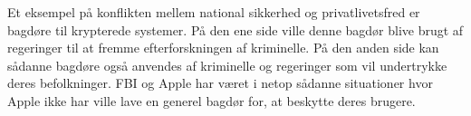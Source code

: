 Et eksempel på konflikten mellem national sikkerhed og privatlivetsfred er bagdøre til krypterede systemer. På den ene side ville denne bagdør blive brugt af regeringer til at fremme efterforskningen af kriminelle. På den anden side kan sådanne bagdøre også anvendes af kriminelle og regeringer som vil undertrykke deres befolkninger. FBI og Apple har været i netop sådanne situationer hvor Apple ikke har ville lave en generel bagdør for, at beskytte deres brugere.\cite{FBI/Apple_encryption}



